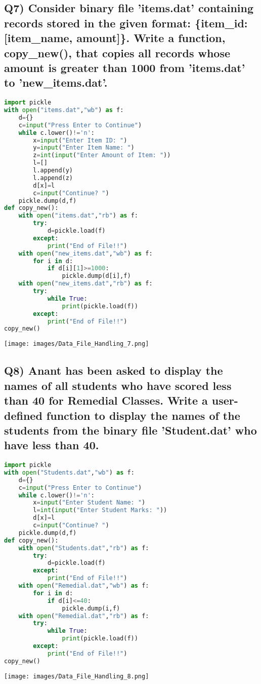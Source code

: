 \documentclass{article}
\begin{document}
\subsection*{Q7) Consider binary file 'items.dat' containing records stored in the given format: \{item\_id: [item\_name, amount]\}. Write a function, copy\_new(), that copies all records whose amount is greater than 1000 from 'items.dat' to 'new\_items.dat'.}
\begin{lstlisting}[language=Python]
import pickle
with open("items.dat","wb") as f:
    d={}
    c=input("Press Enter to Continue")
    while c.lower()!='n':
        x=input("Enter Item ID: ")
        y=input("Enter Item Name: ")
        z=int(input("Enter Amount of Item: "))
        l=[]
        l.append(y)
        l.append(z)
        d[x]=l
        c=input("Continue? ")
    pickle.dump(d,f)
def copy_new():
    with open("items.dat","rb") as f:
        try:
            d=pickle.load(f)
        except:
            print("End of File!!")
    with open("new_items.dat","wb") as f:
        for i in d:
            if d[i][1]>=1000:
                pickle.dump(d[i],f)
    with open("new_items.dat","rb") as f:
        try:
            while True:
                print(pickle.load(f))
        except:
            print("End of File!!")
copy_new()
\end{lstlisting}
\texttt{[image: images/Data\_File\_Handling\_7.png]}

\subsection*{Q8) Anant has been asked to display the names of all students who have scored less than 40 for Remedial Classes. Write a user-defined function to display the names of the students from the binary file 'Student.dat' who have less than 40.}
\begin{lstlisting}[language=Python]
import pickle
with open("Students.dat","wb") as f:
    d={}
    c=input("Press Enter to Continue")
    while c.lower()!='n':
        x=input("Enter Student Name: ")
        l=int(input("Enter Student Marks: "))
        d[x]=l
        c=input("Continue? ")
    pickle.dump(d,f)
def copy_new():
    with open("Students.dat","rb") as f:
        try:
            d=pickle.load(f)
        except:
            print("End of File!!")
    with open("Remedial.dat","wb") as f:
        for i in d:
            if d[i]<=40:
                pickle.dump(i,f)
    with open("Remedial.dat","rb") as f:
        try:
            while True:
                print(pickle.load(f))
        except:
            print("End of File!!")
copy_new()
\end{lstlisting}
\texttt{[image: images/Data\_File\_Handling\_8.png]}
\end{document}
